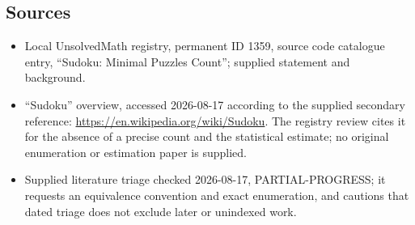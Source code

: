 \documentclass[11pt]{article}
\begin{document}
\subsection{Sources}
\begin{itemize}
\item Local UnsolvedMath registry, permanent ID 1359, source code catalogue entry, ``Sudoku: Minimal Puzzles Count''; supplied statement and background.
\item ``Sudoku'' overview, accessed 2026-08-17 according to the supplied secondary reference: \url{https://en.wikipedia.org/wiki/Sudoku}. The registry review cites it for the absence of a precise count and the statistical estimate; no original enumeration or estimation paper is supplied.
\item Supplied literature triage checked 2026-08-17, PARTIAL-PROGRESS; it requests an equivalence convention and exact enumeration, and cautions that dated triage does not exclude later or unindexed work.
\end{itemize}
\end{document}
